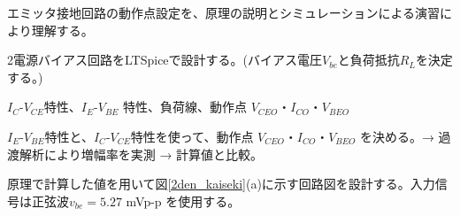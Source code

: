 エミッタ接地回路の動作点設定を、原理の説明とシミュレーションによる演習により理解する。

\begin{description}
  \setlength{\parskip}{0cm} %
  \setlength{\itemsep}{0cm} %
  \item[ゴール] 2電源バイアス回路をLTSpiceで設計する。(バイアス電圧$V_{be}$と負荷抵抗$R_L$を決定する。)
  \item[キーワード] $I_C$-$V_{CE}$特性、$I_E$-$V_{BE}$ 特性、負荷線、動作点 $V_{CEO}$・$I_{CO}$・$V_{BEO}$
  \item[ストーリー] $I_E$-$V_{BE}$特性と、$I_C$-$V_{CE}$特性を使って、動作点 $V_{CEO}$・$I_{CO}$・$V_{BEO}$ を決める。→ 過渡解析により増幅率を実測 → 計算値と比較。
\end{description}

原理で計算した値を用いて図\ref{2den_kaiseki}(a)に示す回路図を設計する。入力信号は正弦波$v_{be} = 5.27$ mVp-p を使用する。

